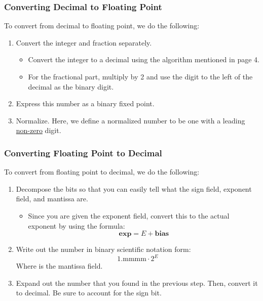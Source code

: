 \documentclass[letterpaper]{article}
\begin{document}
\subsubsection{Converting Decimal to Floating Point}
To convert from decimal to floating point, we do the following:
\begin{enumerate}[(1)]
    \item Convert the integer and fraction separately. 
    \begin{itemize}
        \item Convert the integer to a decimal using the algorithm mentioned in page 4. 
        \item For the fractional part, multiply by 2 and use the digit to the left of the decimal as the binary digit. 
    \end{itemize}
    \item Express this number as a binary fixed point.
    \item Normalize. Here, we define a normalized number to be one with a leading \underline{non-zero} digit.  
\end{enumerate}

\subsubsection{Converting Floating Point to Decimal}
To convert from floating point to decimal, we do the following:
\begin{enumerate}[(1)]
    \item Decompose the bits so that you can easily tell what the sign field, exponent field, and mantissa are. 
    \begin{itemize}
        \item Since you are given the exponent field, convert this to the actual exponent by using the formula:
        \[\textbf{exp} = E + \textbf{bias}\]
    \end{itemize}
    
    \item Write out the number in binary scientific notation form:
    \[1.\text{mmmm} \cdot 2^E\]
    Where  is the mantissa field. 

    \item Expand out the number that you found in the previous step. Then, convert it to decimal. Be sure to account for the sign bit. 
\end{enumerate}
\end{document}
